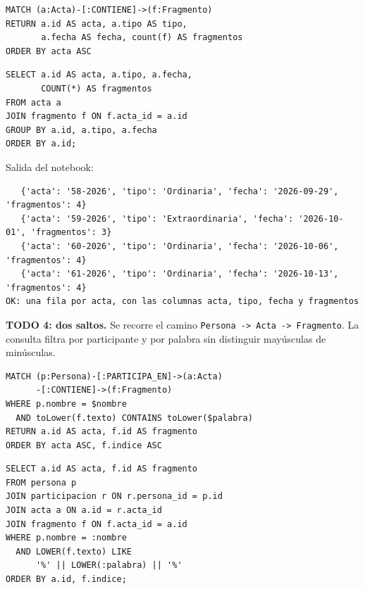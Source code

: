 \documentclass[10pt,letterpaper]{article}
\begin{document}
\noindent\begin{minipage}[t]{0.48\textwidth}
\begin{Verbatim}
MATCH (a:Acta)-[:CONTIENE]->(f:Fragmento)
RETURN a.id AS acta, a.tipo AS tipo,
       a.fecha AS fecha, count(f) AS fragmentos
ORDER BY acta ASC
\end{Verbatim}
\end{minipage}\hfill
\begin{minipage}[t]{0.48\textwidth}
\begin{Verbatim}
SELECT a.id AS acta, a.tipo, a.fecha,
       COUNT(*) AS fragmentos
FROM acta a
JOIN fragmento f ON f.acta_id = a.id
GROUP BY a.id, a.tipo, a.fecha
ORDER BY a.id;
\end{Verbatim}
\end{minipage}

Salida del notebook:
\begin{Verbatim}
   {'acta': '58-2026', 'tipo': 'Ordinaria', 'fecha': '2026-09-29', 'fragmentos': 4}
   {'acta': '59-2026', 'tipo': 'Extraordinaria', 'fecha': '2026-10-01', 'fragmentos': 3}
   {'acta': '60-2026', 'tipo': 'Ordinaria', 'fecha': '2026-10-06', 'fragmentos': 4}
   {'acta': '61-2026', 'tipo': 'Ordinaria', 'fecha': '2026-10-13', 'fragmentos': 4}
OK: una fila por acta, con las columnas acta, tipo, fecha y fragmentos
\end{Verbatim}

\textbf{TODO 4: dos saltos.}
Se recorre el camino
\texttt{Persona -> Acta -> Fragmento}.
La consulta filtra por participante y por palabra
sin distinguir mayúsculas de minúsculas.

\noindent\begin{minipage}[t]{0.48\textwidth}
\begin{Verbatim}
MATCH (p:Persona)-[:PARTICIPA_EN]->(a:Acta)
      -[:CONTIENE]->(f:Fragmento)
WHERE p.nombre = $nombre
  AND toLower(f.texto) CONTAINS toLower($palabra)
RETURN a.id AS acta, f.id AS fragmento
ORDER BY acta ASC, f.indice ASC
\end{Verbatim}
\end{minipage}\hfill
\begin{minipage}[t]{0.48\textwidth}
\begin{Verbatim}
SELECT a.id AS acta, f.id AS fragmento
FROM persona p
JOIN participacion r ON r.persona_id = p.id
JOIN acta a ON a.id = r.acta_id
JOIN fragmento f ON f.acta_id = a.id
WHERE p.nombre = :nombre
  AND LOWER(f.texto) LIKE
      '%' || LOWER(:palabra) || '%'
ORDER BY a.id, f.indice;
\end{Verbatim}
\end{minipage}
\end{document}

